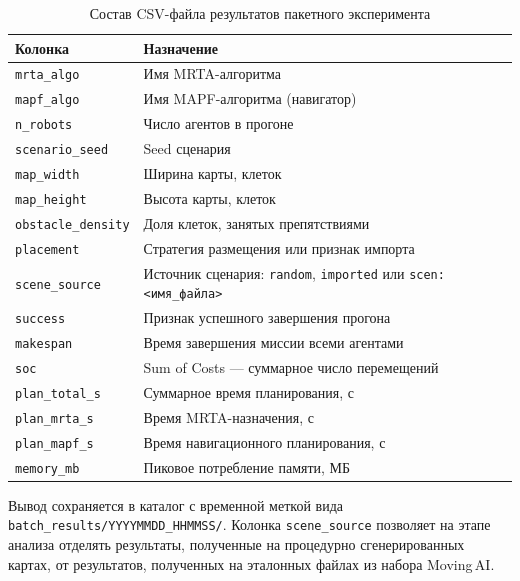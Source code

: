 \begin{table}
    \caption{Состав CSV-файла результатов пакетного эксперимента}
    \begin{tabularx}{\textwidth}{|l|X|}\hline
    Колонка & Назначение \\ \hline
    \texttt{mrta\_algo}        & Имя MRTA-алгоритма \\ \hline
    \texttt{mapf\_algo}        & Имя MAPF-алгоритма (навигатор) \\ \hline
    \texttt{n\_robots}         & Число агентов в прогоне \\ \hline
    \texttt{scenario\_seed}    & Seed сценария \\ \hline
    \texttt{map\_width}        & Ширина карты, клеток \\ \hline
    \texttt{map\_height}       & Высота карты, клеток \\ \hline
    \texttt{obstacle\_density} & Доля клеток, занятых препятствиями \\ \hline
    \texttt{placement}         & Стратегия размещения или признак импорта \\ \hline
    \texttt{scene\_source}     & Источник сценария: \texttt{random}, \texttt{imported} или \texttt{scen:<имя\_файла>} \\ \hline
    \texttt{success}           & Признак успешного завершения прогона \\ \hline
    \texttt{makespan}          & Время завершения миссии всеми агентами \\ \hline
    \texttt{soc}               & Sum of Costs --- суммарное число перемещений \\ \hline
    \texttt{plan\_total\_s}    & Суммарное время планирования, с \\ \hline
    \texttt{plan\_mrta\_s}     & Время MRTA-назначения, с \\ \hline
    \texttt{plan\_mapf\_s}     & Время навигационного планирования, с \\ \hline
    \texttt{memory\_mb}        & Пиковое потребление памяти, МБ \\ \hline
    \end{tabularx}
    \label{tab:batch_csv}
\end{table}

Вывод сохраняется в каталог с временной меткой вида \texttt{batch\_results/YYYY\-MMDD\_HHMMSS/}. Колонка \texttt{scene\_source} позволяет на этапе анализа отделять результаты, полученные на процедурно сгенерированных картах, от результатов, полученных на эталонных файлах из набора Moving\,AI.
